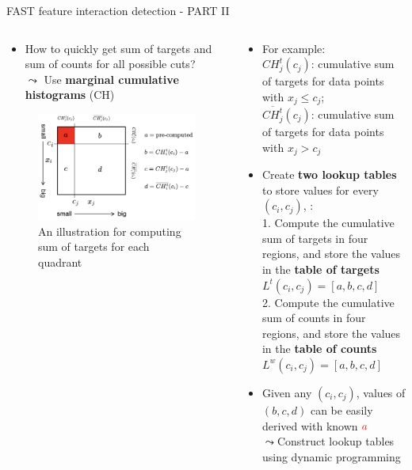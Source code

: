 \documentclass[11pt,compress,t,notes=noshow, aspectratio=169, xcolor=table]{beamer}
\begin{document}
\begin{frame}{FAST feature interaction detection - PART II}

\begin{columns}[T, totalwidth=\textwidth]
\begin{column}{0.5\textwidth}
\begin{itemize}
\item How to quickly get sum of targets and sum of counts for all possible cuts?\\
    $\leadsto$ Use \textbf{marginal cumulative histograms} (CH)
\end{itemize}
\begin{figure}
    \centering
    \includegraphics[width=\linewidth]
    {figure/FAST.png}
    \\An illustration for computing sum of targets for each quadrant
    \label{fig:FAST2}
\end{figure}
\end{column}
\hfill
\centering
\begin{column}{0.6\textwidth}
\begin{itemize}
    \item For example:\\
    $CH_j^t(c_j)$: cumulative sum of targets for data points with $x_j\leq c_j$;\\
    $\overline{CH_j^t }(c_j)$: cumulative sum of targets for data points with $x_j>c_j$
    \item Create \textbf{two lookup tables} to store values for every $(c_i, c_j)$, :\\
    1. Compute the cumulative sum of targets in four regions, and store the values in the \textbf{table of targets} $L^t(c_i,c_j)=[a,b,c,d]$\\
    2. Compute the cumulative sum of counts in four regions, and store the values in the \textbf{table of counts} $L^w(c_i,c_j)=[a,b,c,d]$
    \item Given any $(c_i, c_j)$, values of $(b,c,d)$ can be easily derived with known $\color{red}a$\\
    $\leadsto$Construct lookup tables using dynamic programming
\end{itemize}
\end{column}
\end{columns}

\end{frame}
\end{document}
